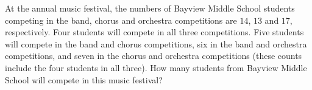 At the annual music festival, the numbers of Bayview Middle School students competing in the band, chorus and orchestra competitions are $14$, $13$ and $17$, respectively. Four students will compete in all three competitions. Five students will compete in the band and chorus competitions, six in the band and orchestra competitions, and seven in the chorus and orchestra competitions (these counts include the four students in all three). How many students from Bayview Middle School will compete in this music festival?
